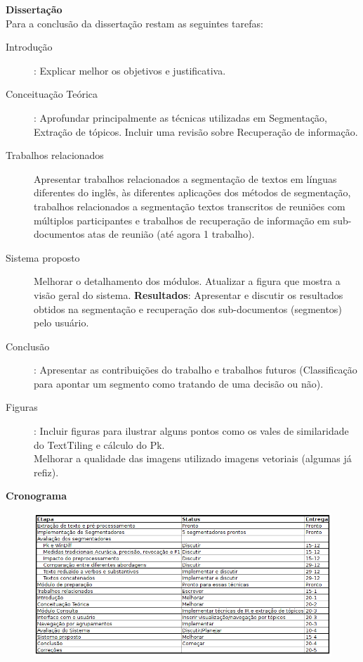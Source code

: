 {
\Large \textbf{Dissertação}
}\\

Para a conclusão da dissertação restam as seguintes tarefas:

\begin{description}
	\item[Introdução]: Explicar melhor os objetivos e justificativa.

	\item[Conceituação Teórica]: Aprofundar principalmente as técnicas utilizadas em Segmentação, Extração de tópicos. Incluir uma revisão sobre Recuperação de informação.

	\item[Trabalhos relacionados] Apresentar trabalhos relacionados a segmentação de textos em línguas diferentes do inglês, às diferentes aplicações dos métodos de segmentação, trabalhos relacionados a segmentação textos transcritos de reuniões com múltiplos participantes e trabalhos de recuperação de informação em sub-documentos atas de reunião (até agora 1 trabalho).

	\item[Sistema proposto] Melhorar o detalhamento dos módulos. Atualizar a figura que mostra a visão geral do sistema. \textbf{Resultados}: Apresentar e discutir os resultados obtidos na segmentação e recuperação dos sub-documentos (segmentos) pelo usuário.

	\item[Conclusão] : Apresentar as contribuições do trabalho e trabalhos futuros (Classificação para apontar um segmento como tratando de uma decisão ou não).
	
	\item[Figuras] : Incluir figuras para ilustrar alguns pontos como os vales de similaridade do TextTiling e cálculo do Pk. \\Melhorar a qualidade das imagens utilizado imagens vetoriais (algumas já refiz).
	
\end{description}


\vi 

{
\Large \textbf{Cronograma}
}\\


  \begin{figure}[!h]

	\centering
	\includegraphics[width=\textwidth]{crono.png}
	\label{fig:exemplosegmentacaozoom}

  \end{figure}






